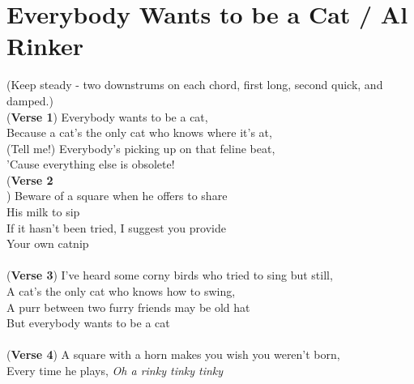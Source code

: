 \section{Everybody Wants to be a Cat / Al Rinker}\label{sec:everybodywantstobeacat}
\EmajorFudgeSeven
\EminorSeven
\EminorSix
\CmajorSeven
\Dseven
\Cseven
\Bseven
\Bminor
\AmajorSeven
\AminorSeven
\Cminor


(\small{Keep steady - two downstrums on each chord, first long, second quick, and damped.})\\
(\textbf{Verse 1}) Everybody wants to be a cat,\\
Because a cat's the only cat who knows where it's at,\\
(Tell me!) Everybody's picking up on that feline beat,\\
'Cause everything else is obsolete! \\
(\textbf{Verse 2}\\) Beware of a square when he offers to share\\
His milk to sip\\
If it hasn't been tried, I suggest you provide\\
Your own catnip\\
 \\
(\textbf{Verse 3}) I've heard some corny birds who tried to sing but still, \\
A cat's the only cat who knows how to swing,\\
A purr between two furry friends may be old hat\\
But everybody wants to be a cat\\
 \\
(\textbf{Verse 4}) A square with a horn makes you wish you weren't born,\\
Every time he plays, \emph{Oh a rinky tinky tinky}\\
